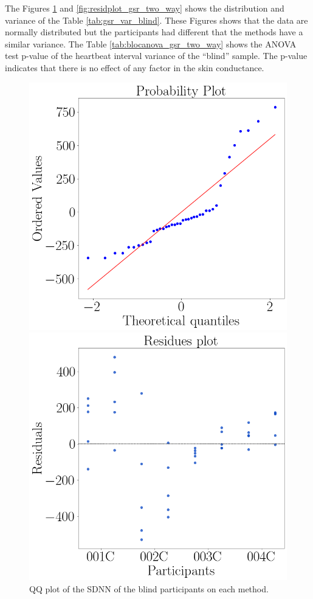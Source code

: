 The Figures \ref{fig:qqplot_gsr_two_way} and \ref{fig:residplot_gsr_two_way} shows the distribution and variance of the Table \ref{tab:gsr_var_blind}. These Figures shows that the data are normally distributed but the participants had different  that the methods have a similar variance.
The Table \ref{tab:blocanova_gsr_two_way} shows the ANOVA test p-value of the heartbeat interval variance of the “blind” sample. The p-value indicates that there is no effect of any factor in the skin conductance.



\begin{figure}[!htb]
    \centering
    \begin{minipage}{0.45\textwidth}
        \centering
        \includegraphics[width = 0.8\linewidth]{Resultados/GSR/Figuras/png/qqplot_gsr_two_way.png}
        \caption{QQ plot of the SDNN of the blind participants on each method.}
        \label{fig:qqplot_gsr_two_way}
    \end{minipage}
    \begin{minipage}{0.45\textwidth}
        \centering
        \includegraphics[width = 0.8\linewidth]{Resultados/GSR/Figuras/png/residplot_gsr_two_way.png}

\end{minipage}
\end{figure}
